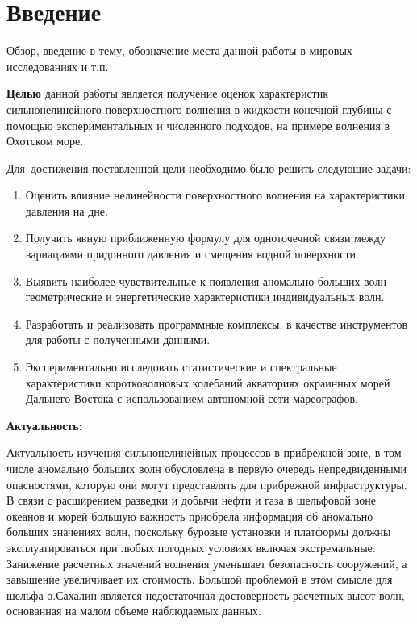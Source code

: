 \chapter*{Введение}							%
Обзор, введение в тему, обозначение места данной работы в мировых исследованиях и т.п.

\textbf{Целью} данной работы является получение оценок характеристик сильнонелинейного поверхностного волнения в жидкости конечной глубины с помощью экспериментальных и численного подходов, на примере волнения в Охотском море.

Для~достижения поставленной цели необходимо было решить следующие задачи:
\begin{enumerate}
  \item Оценить влияние нелинейности поверхностного волнения на характеристики давления на дне.
      
  \item Получить явную приближенную формулу для одноточечной связи между вариациями придонного давления и  смещения водной поверхности. 
  
  \item Выявить наиболее чувствительные к появления аномально больших волн геометрические и энергетические характеристики индивидуальных волн.
      
  \item Разработать и реализовать программные комплексы, в качестве инструментов для работы с полученными данными.


  \item Экспериментально исследовать статистические и спектральные характеристики коротковолновых колебаний акваториях окраинных морей Дальнего Востока с использованием автономной сети мареографов.

\end{enumerate}

\textbf{Актуальность:}

Актуальность изучения сильнонелинейных процессов в прибрежной зоне, в том числе аномально больших волн обусловлена в первую очередь непредвиденными опасностями, которую они могут представлять для прибрежной инфраструктуры. В связи с расширением разведки и добычи нефти и газа в шельфовой зоне океанов и морей большую важность приобрела информация об аномально больших значениях волн, поскольку буровые установки и платформы должны эксплуатироваться при любых погодных условиях включая экстремальные. Занижение расчетных значений волнения уменьшает безопасность сооружений, а завышение увеличивает их стоимость. Большой проблемой в этом смысле для шельфа о.Сахалин является недостаточная достоверность расчетных высот волн, основанная на малом объеме наблюдаемых данных.

